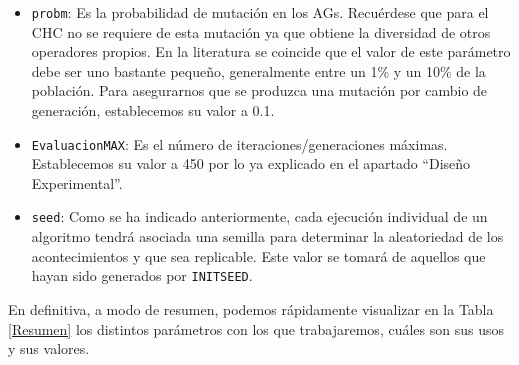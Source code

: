 \begin{itemize}
	\item \texttt{probm}: Es la probabilidad de mutación en los AGs. Recuérdese que para el CHC no se requiere de esta mutación ya que obtiene la diversidad de otros operadores propios. 
	En la literatura se coincide que el valor de este parámetro debe ser uno bastante pequeño, generalmente entre un 1\% y un 10\% de la población. 
	Para asegurarnos que se produzca una mutación por cambio de generación, establecemos su valor a 0.1.
	\item \texttt{EvaluacionMAX}: Es el número de iteraciones/generaciones máximas. 
	Establecemos su valor a 450 por lo ya explicado en el apartado ``Diseño Experimental''.
	\item \texttt{seed}: Como se ha indicado anteriormente, cada ejecución individual de un algoritmo tendrá asociada una semilla para determinar la aleatoriedad de los acontecimientos y que sea replicable. 
	Este valor se tomará de aquellos que hayan sido generados por \texttt{INITSEED}.
\end{itemize}

En definitiva, a modo de resumen, podemos rápidamente visualizar en la Tabla \ref{Resumen} los distintos parámetros con los que trabajaremos, cuáles son sus usos y sus valores.

